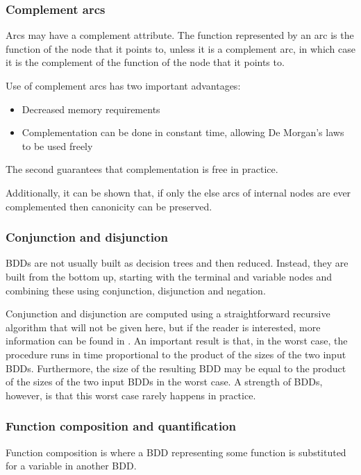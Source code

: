 \subsubsection{Complement arcs}

Arcs may have a complement attribute. The function represented by an arc is the function of the node that it points to, unless it is a complement arc, in which case it is the complement of the function of the node that it points to.

Use of complement arcs has two important advantages:
\begin{itemize}
    \item Decreased memory requirements
    \item Complementation can be done in constant time, allowing De Morgan's laws to be used freely
\end{itemize}

The second guarantees that complementation is free in practice.

Additionally, it can be shown that, if only the else arcs of internal nodes are ever complemented then canonicity can be preserved.

\subsubsection{Conjunction and disjunction}

BDDs are not usually built as decision trees and then reduced. Instead, they are built from the bottom up, starting with the terminal and variable nodes and combining these using conjunction, disjunction and negation.

Conjunction and disjunction are computed using a straightforward recursive algorithm that will not be given here, but if the reader is interested, more information can be found in \cite{Bryant_86}. An important result is that, in the worst case, the procedure runs in time proportional to the product of the sizes of the two input BDDs. Furthermore, the size of the resulting BDD may be equal to the product of the sizes of the two input BDDs in the worst case. A strength of BDDs, however, is that this worst case rarely happens in practice. 

\subsubsection{Function composition and quantification}

Function composition is where a BDD representing some function is substituted for a variable in another BDD.

